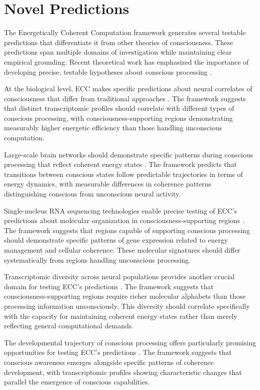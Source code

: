 \section{Novel Predictions}

The Energetically Coherent Computation framework generates several testable predictions that differentiate it from other theories of consciousness. These predictions span multiple domains of investigation while maintaining clear empirical grounding. Recent theoretical work has emphasized the importance of developing precise, testable hypotheses about conscious processing \cite{Dehaene2014}.

At the biological level, ECC makes specific predictions about neural correlates of consciousness that differ from traditional approaches \cite{Koch2016}. The framework suggests that distinct transcriptomic profiles should correlate with different types of conscious processing, with consciousness-supporting regions demonstrating measurably higher energetic efficiency than those handling unconscious computation.

Large-scale brain networks should demonstrate specific patterns during conscious processing that reflect coherent energy states \cite{Mashour2018}. The framework predicts that transitions between conscious states follow predictable trajectories in terms of energy dynamics, with measurable differences in coherence patterns distinguishing conscious from unconscious neural activity.

Single-nucleus RNA sequencing technologies enable precise testing of ECC's predictions about molecular organization in consciousness-supporting regions \cite{Lake2016}. The framework suggests that regions capable of supporting conscious processing should demonstrate specific patterns of gene expression related to energy management and cellular coherence. These molecular signatures should differ systematically from regions handling unconscious processing.

Transcriptomic diversity across neural populations provides another crucial domain for testing ECC's predictions \cite{Tasic2018}. The framework suggests that consciousness-supporting regions require richer molecular alphabets than those processing information unconsciously. This diversity should correlate specifically with the capacity for maintaining coherent energy states rather than merely reflecting general computational demands.

The developmental trajectory of conscious processing offers particularly promising opportunities for testing ECC's predictions \cite{DehaeneLambertz2015}. The framework suggests that conscious awareness emerges alongside specific patterns of coherence development, with transcriptomic profiles showing characteristic changes that parallel the emergence of conscious capabilities.

